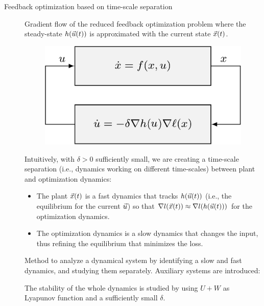 \begin{description}
    \item[Feedback optimization based on time-scale separation] 
        Gradient flow of the reduced feedback optimization problem where the steady-state $h({\vec{u}}(t))$ is approximated with the current state ${\vec{x}}(t)$.

        \begin{figure}[H]
            \centering
            \includegraphics[width=0.35\linewidth]{./img/feedback_timescale.png}
        \end{figure}

        Intuitively, with $\delta > 0$ sufficiently small, we are creating a time-scale separation (i.e., dynamics working on different time-scales) between plant and optimization dynamics:
        \begin{itemize}
            \item The plant ${\vec{x}}(t)$ is a fast dynamics that tracks $h({\vec{u}}(t))$ (i.e., the equilibrium for the current ${\vec{u}}$) so that $\nabla l({\vec{x}}(t)) \approx \nabla l(h({\vec{u}}(t)))$ for the optimization dynamics.
            \item The optimization dynamics is a slow dynamics that changes the input, thus refining the equilibrium that minimizes the loss.
        \end{itemize}


    \begin{remark}
        Method to analyze a dynamical system by identifying a slow and fast dynamics, and studying them separately. Auxiliary systems are introduced:
        The stability of the whole dynamics is studied by using $U+W$ as Lyapunov function and a sufficiently small $\delta$.


\end{remark}
\end{description}
